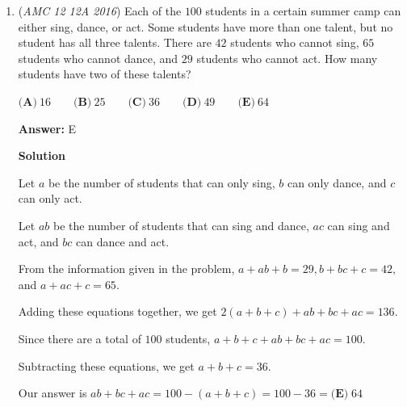 \begin{enumerate}
\textbf{Solution 2}

Note that the person (out of A,B,C) that moves the most, moves the amount equal to the sum of what the other 2 move. They essentially make a cycle. D & E are seat fillers and can be ignored. A,B,C take up either seats 1,2,3 or 2,4,5. In each case you find A was originally in seat $\boxed{\text{(B)}~2}$.

 



\textbf{Solution 3 (Net Displacement)}

Note that the net displacements sum up to $0$. The sum of the net displacements of Bea, Ceci, Dee, Edie is $2-1 = 1$, so Ada moved exactly $1$ place to the left. Since Ada ended on an end seat, she must have started on seat $\boxed{(\text{B})~2}$.

 


 


	\item (\textit{AMC 12 12A 2016}) Each of the $100$ students in a certain summer camp can either sing, dance, or act. Some students have more than one talent, but no student has all three talents. There are $42$ students who cannot sing, $65$ students who cannot dance, and $29$ students who cannot act. How many students have two of these talents?


 $\textbf{(A)}\ 16\qquad\textbf{(B)}\ 25\qquad\textbf{(C)}\ 36\qquad\textbf{(D)}\ 49\qquad\textbf{(E)}\ 64$

 \textbf{Answer: }E



\textbf{Solution}

Let $a$ be the number of students that can only sing, $b$ can only dance, and $c$ can only act.

 Let $ab$ be the number of students that can sing and dance, $ac$ can sing and act, and $bc$ can dance and act.

 From the information given in the problem, $a + ab + b = 29, b + bc + c = 42,$ and $a + ac + c = 65$.

 Adding these equations together, we get $2(a + b + c) + ab + bc + ac = 136$.

 Since there are a total of $100$ students, $a + b + c + ab + bc + ac = 100$.

 Subtracting these equations, we get $a + b + c = 36$.

 Our answer is $ab + bc + ac = 100 - (a + b + c) = 100 - 36 = \boxed{\textbf{(E)}\; 64}$





\end{enumerate}
